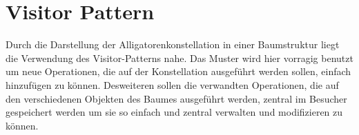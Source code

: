 \section{Visitor Pattern}
Durch die Darstellung der Alligatorenkonstellation in einer Baumstruktur liegt die Verwendung des Visitor-Patterns nahe.
Das Muster wird hier vorragig benutzt um neue Operationen, die auf der Konstellation ausgeführt werden sollen, einfach hinzufügen zu können.
Desweiteren sollen die verwandten Operationen, die auf den verschiedenen Objekten des Baumes ausgeführt werden, zentral im Besucher gespeichert werden um sie so einfach und zentral verwalten und modifizieren zu können.
